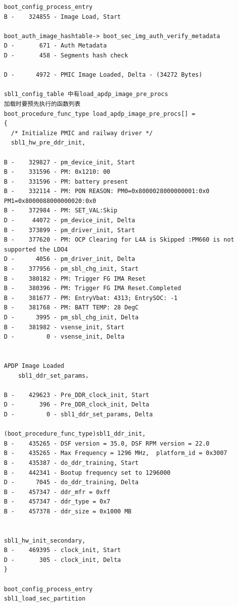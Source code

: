 \begin{lstlisting}
boot_config_process_entry
B -    324855 - Image Load, Start

boot_auth_image_hashtable-> boot_sec_img_auth_verify_metadata
D -       671 - Auth Metadata
D -       458 - Segments hash check

D -      4972 - PMIC Image Loaded, Delta - (34272 Bytes)

sbl1_config_table 中有load_apdp_image_pre_procs
加载时要预先执行的函数列表
boot_procedure_func_type load_apdp_image_pre_procs[] = 
{
  /* Initialize PMIC and railway driver */
  sbl1_hw_pre_ddr_init,

B -    329827 - pm_device_init, Start
B -    331596 - PM: 0x1210: 00
B -    331596 - PM: battery present
B -    332114 - PM: PON REASON: PM0=0x8000028000000001:0x0 PM1=0x8000088000000020:0x0 
B -    372984 - PM: SET_VAL:Skip
D -     44072 - pm_device_init, Delta
B -    373899 - pm_driver_init, Start
B -    377620 - PM: OCP Clearing for L4A is Skipped :PM660 is not supported the LDO4
D -      4056 - pm_driver_init, Delta
B -    377956 - pm_sbl_chg_init, Start
B -    380182 - PM: Trigger FG IMA Reset
B -    380396 - PM: Trigger FG IMA Reset.Completed
B -    381677 - PM: EntryVbat: 4313; EntrySOC: -1
B -    381768 - PM: BATT TEMP: 28 DegC
D -      3995 - pm_sbl_chg_init, Delta
B -    381982 - vsense_init, Start
D -         0 - vsense_init, Delta


APDP Image Loaded
	sbl1_ddr_set_params，

B -    429623 - Pre_DDR_clock_init, Start
D -       396 - Pre_DDR_clock_init, Delta
D -         0 - sbl1_ddr_set_params, Delta

(boot_procedure_func_type)sbl1_ddr_init,
B -    435265 - DSF version = 35.0, DSF RPM version = 22.0
B -    435265 - Max Frequency = 1296 MHz,  platform_id = 0x3007
B -    435387 - do_ddr_training, Start
B -    442341 - Bootup frequency set to 1296000
D -      7045 - do_ddr_training, Delta
B -    457347 - ddr_mfr = 0xff
B -    457347 - ddr_type = 0x7
B -    457378 - ddr_size = 0x1000 MB


sbl1_hw_init_secondary,
B -    469395 - clock_init, Start
D -       305 - clock_init, Delta
}

boot_config_process_entry
sbl1_load_sec_partition


\end{lstlisting}
